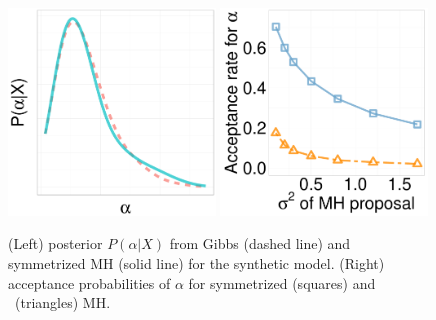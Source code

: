  \begin{figure}[H]
  \begin{minipage}[!hp]{0.49\linewidth}
    \includegraphics [width=0.49\textwidth, angle=0]{figs/EXP_ks/exp_hist_44_05_10_.pdf}
    \includegraphics [width=0.49\textwidth, angle=0]{figs/acc/EXP_D10alpha_k2.pdf}
  \end{minipage}
  \begin{minipage}[!hp]{0.49\linewidth}
    \vspace{-.2in}
    \caption{(Left) posterior $P(\alpha|X)$ from Gibbs (dashed line) and symmetrized MH (solid line) for the synthetic model. (Right) acceptance probabilities of $\alpha$ for symmetrized (squares) and \naive\ (triangles) MH.} 
    \label{fig:POST_EXP}
  \end{minipage}
  \end{figure}
